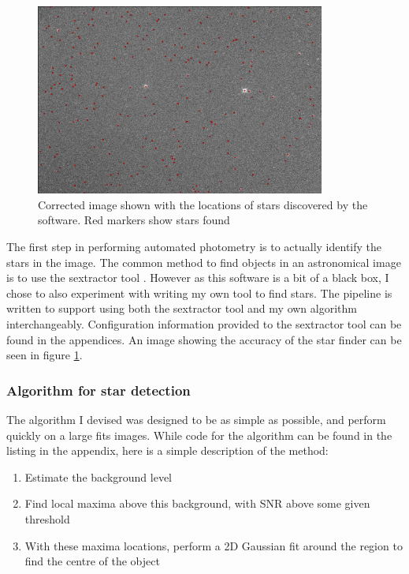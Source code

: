 \begin{figure}[ht]
    \centering
    \includegraphics[width=0.85\textwidth]{images/starfinder.png}
    \caption{Corrected image shown with the locations of stars discovered by the software. Red markers show stars found}
    \label{fig:finder_image}
\end{figure}

The first step in performing automated photometry is to actually identify the stars in the image. The common method to find objects in an astronomical image is to use the sextractor tool \citep{bertin1996sextractor}. However as this software is a bit of a black box, I chose to also experiment with writing my own tool to find stars. The pipeline is written to support using both the sextractor tool and my own algorithm interchangeably. Configuration information provided to the sextractor tool can be found in the appendices. An image showing the accuracy of the star finder can be seen in figure \ref{fig:finder_image}.

\subsubsection{Algorithm for star detection}

The algorithm I devised was designed to be as simple as possible, and perform quickly on a large fits images. While code for the algorithm can be found in the listing in the appendix, here is a simple description of the method:

\begin{enumerate}
    \item Estimate the background level
    \item Find local maxima above this background, with SNR above some given threshold
    \item With these maxima locations, perform a 2D Gaussian fit around the region to find the centre of the object
\end{enumerate}

